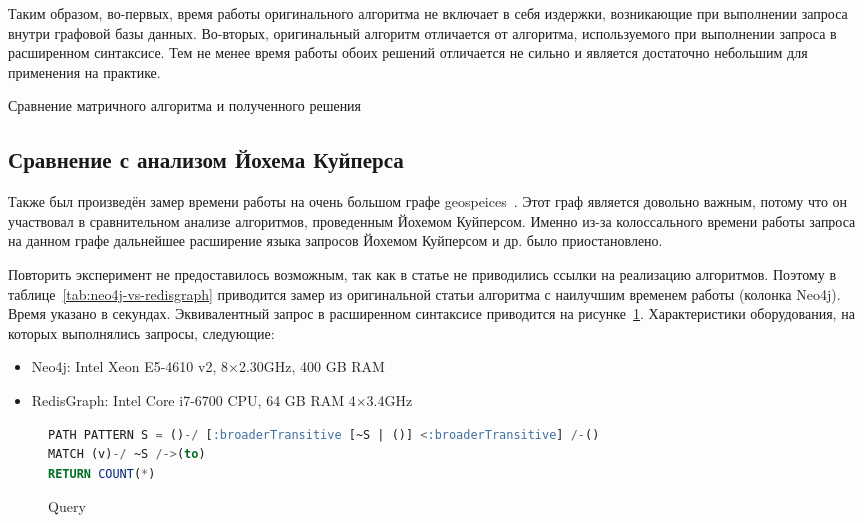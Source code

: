 \documentclass[14pt]{matmex-diploma-custom}
\begin{document}
Таким образом, во-первых, время работы оригинального алгоритма не включает в себя издержки, возникающие при выполнении запроса внутри графовой базы данных. Во-вторых, оригинальный алгоритм отличается от алгоритма, используемого при выполнении запроса в расширенном синтаксисе. Тем не менее время работы обоих решений отличается не сильно и является достаточно небольшим для применения на практике.
\begin{table}[h!]
\begin{adjustbox}{max width=\textwidth}

\end{adjustbox}
\caption{Сравнение матричного алгоритма и полученного решения}
\label{tab:combinators_vs_redisgraph}
\end{table}

\subsection{Сравнение с анализом Йохема Куйперса}
Также был произведён замер времени работы на очень большом графе geospeices~\cite{geospices}. Этот граф является довольно важным, потому что он участвовал в сравнительном анализе алгоритмов, проведенным Йохемом Куйперсом. Именно из-за колоссального времени работы запроса на данном графе дальнейшее расширение языка запросов Йохемом Куйперсом и др. было приостановлено. 

Повторить эксперимент не предоставилось возможным, так как в статье не приводились ссылки на реализацию алгоритмов. Поэтому в таблице~\ref{tab:neo4j-vs-redisgraph} приводится замер из оригинальной статьи алгоритма с наилучшим временем работы (колонка Neo4j). Время указано в секундах. Эквивалентный запрос в расширенном синтаксисе приводится на рисунке~\ref{code:broaderTransitive}. Характеристики оборудования, на которых выполнялись запросы, следующие:

\begin{itemize}
    \item Neo4j: Intel Xeon E5-4610 v2, 8$\times$2.30GHz, 400 GB RAM
    \item RedisGraph: Intel Core i7-6700 CPU, 64 GB RAM 4$\times$3.4GHz
\end{itemize}

\begin{figure}[h!]
\begin{adjustbox}{max width=\textwidth}
\begin{lstlisting}[language=sql]
PATH PATTERN S = ()-/ [:broaderTransitive [~S | ()] <:broaderTransitive] /-()
MATCH (v)-/ ~S /->(to)
RETURN COUNT(*)
\end{lstlisting}
\end{adjustbox}
\caption{Query}
\label{code:broaderTransitive}
\end{figure}
\end{document}

